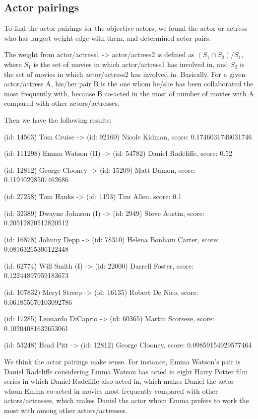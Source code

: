 \documentclass[11pt]{article}
\begin{document}
\subsection{Actor pairings}

To find the actor pairings for the objective actors, we found the actor or actress who has largest weight edge with them, and determined actor pairs. 

The weight from actor/actress1 -> actor/actress2 is defined as $(S_1 \cap S_2) / S_1$, where $S_1$ is the set of movies in which actor/actress1 has involved in, and $S_2$ is the set of movies in which actor/actress2 has involved in. Basically, For a given actor/actress A, his/her pair B is the one whom he/she has been collaborated the most frequently with, because B co-acted in the most of number of movies with A compared with other actors/actresses.

Then we have the following results:

(id: 14503) Tom Cruise -> (id: 92160) Nicole Kidman, score: 0.1746031746031746

(id: 111298) Emma Watson (II) -> (id: 54782) Daniel Radcliffe, score: 0.52

(id: 12812) George Clooney -> (id: 15209) Matt Damon, score: 0.11940298507462686

(id: 27258) Tom Hanks -> (id: 1193) Tim Allen, score: 0.1

(id: 32389) Dwayne Johnson (I) -> (id: 2949) Steve Austin, score: 0.20512820512820512

(id: 16878) Johnny Depp -> (id: 78310) Helena Bonham Carter, score: 0.08163265306122448

(id: 62774) Will Smith (I) -> (id: 22000) Darrell Foster, score: 0.12244897959183673

(id: 107832) Meryl Streep -> (id: 16135) Robert De Niro, score: 0.061855670103092786

(id: 17285) Leonardo DiCaprio -> (id: 60365) Martin Scorsese, score: 0.10204081632653061

(id: 53248) Brad Pitt -> (id: 12812) George Clooney, score: 0.09859154929577464

We think the actor pairings make sense. For instance, Emma Watson's pair is Daniel Radcliffe considering Emma Watson has acted in eight Harry Potter film series in which Daniel Radcliffe also acted in, which makes Daniel the actor whom Emma co-acted in movies most frequently compared with other actors/actresses, which makes Daniel the actor whom Emma prefers to work the most with among other actors/actresses.
\end{document}

